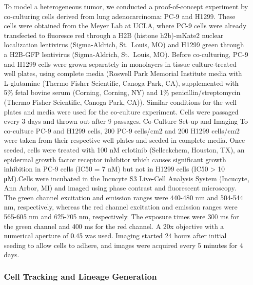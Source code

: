 \documentclass[11pt]{article}
\begin{document}
To model a heterogeneous tumor, we conducted a proof-of-concept
experiment by co-culturing cells derived from lung adenocarcinoma: PC-9
and H1299. These cells were obtained from the Meyer Lab at UCLA, where
PC-9 cells were already transfected to fluoresce red through a H2B
(histone h2b)-mKate2 nuclear localization lentivirus (Sigma-Aldrich,
St.~Louis, MO) and H1299 green through a H2B-GFP lentivirus
(Sigma-Aldrich, St.~Louis, MO). Before co-culturing, PC-9 and H1299
cells were grown separately in monolayers in tissue culture-treated well
plates, using complete media (Roswell Park Memorial Institute media with
L-glutamine (Thermo Fisher Scientific, Canoga Park, CA), supplemented
with 5\% fetal bovine serum (Corning, Corning, NY) and 1\%
penicillin/streptomycin (Thermo Fisher Scientific, Canoga Park, CA)).
Similar conditions for the well plates and media were used for the
co-culture experiment. Cells were passaged every 3 days and thrown out
after 9 passages. Co-Culture Set-up and Imaging To co-culture PC-9 and
H1299 cells, 200 PC-9 cells/cm2 and 200 H1299 cells/cm2 were taken from
their respective well plates and seeded in complete media. Once seeded,
cells were treated with 100 nM erlotinib (Selleckchem, Houston, TX), an
epidermal growth factor receptor inhibitor which causes significant
growth inhibition in PC-9 cells (IC50 = 7 nM) but not in H1299 cells
(IC50 \textgreater{} 10 μM).Cells were incubated in the Incucyte S3
Live-Cell Analysis System (Incucyte, Ann Arbor, MI) and imaged using
phase contrast and fluorescent microscopy. The green channel excitation
and emission ranges were 440-480 nm and 504-544 nm, respectively,
whereas the red channel excitation and emission ranges were 565-605 nm
and 625-705 nm, respectively. The exposure times were 300 ms for the
green channel and 400 ms for the red channel. A 20x objective with a
numerical aperture of 0.45 was used. Imaging started 24 hours after
initial seeding to allow cells to adhere, and images were acquired every
5 minutes for 4 days.

\hypertarget{cell-tracking-and-lineage-generation}{%
\subsubsection{Cell Tracking and Lineage
Generation}\label{cell-tracking-and-lineage-generation}}
\end{document}
